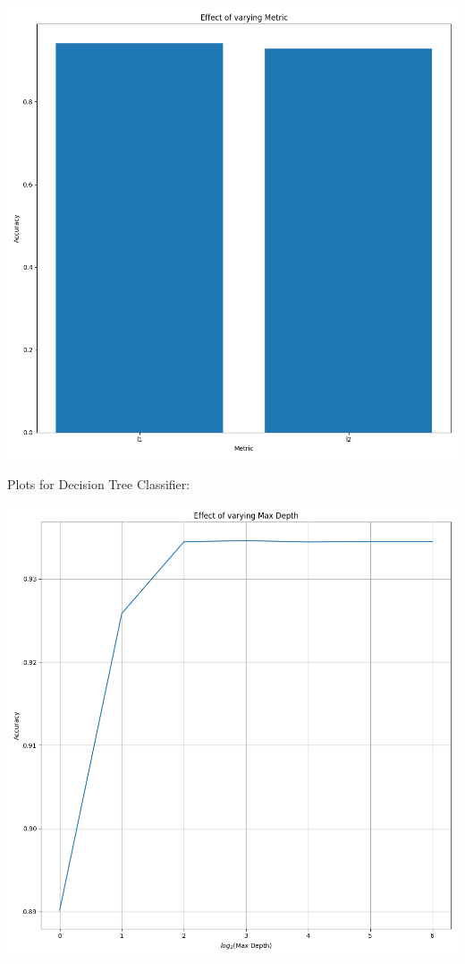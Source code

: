 \documentclass[12pt, letterpaper]{article}
\begin{document}
\includegraphics[scale=\myscale]{knn_Metric.png}

Plots for Decision Tree Classifier:

\includegraphics[scale=\myscale]{decision_tree_classifier_Max Depth.png}
\end{document}
